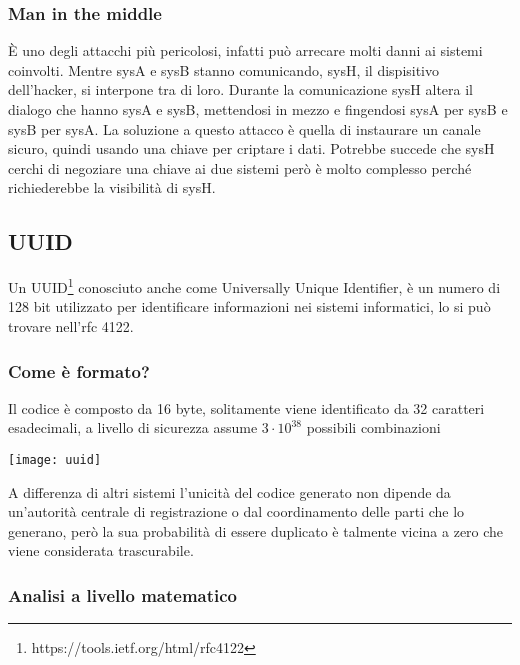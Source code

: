 \subsubsection{Man in the middle}
\hspace{\parindent}È uno degli attacchi più pericolosi, infatti può arrecare molti danni ai sistemi coinvolti. Mentre sysA e sysB stanno comunicando, sysH, il dispisitivo dell'hacker, si interpone tra di loro. Durante la comunicazione sysH altera il dialogo che hanno sysA e sysB, mettendosi in mezzo e fingendosi sysA per sysB e sysB per sysA. La soluzione a questo attacco è quella di instaurare un canale sicuro, quindi usando una chiave per criptare i dati. 
Potrebbe succede che sysH cerchi di negoziare una chiave ai due sistemi però è molto complesso perché richiederebbe la visibilità di sysH.

\subsection{UUID}
\hspace{\parindent}Un UUID\footnote{https://tools.ietf.org/html/rfc4122} conosciuto anche come Universally Unique Identifier, è un numero di 128 bit utilizzato per identificare informazioni nei sistemi informatici, lo si può trovare nell'rfc 4122.
\subsubsection{Come è formato?}
Il codice è composto da 16 byte, solitamente viene identificato da 32 caratteri esadecimali, a livello di sicurezza assume $ 3 \cdot 10^{38}$ possibili combinazioni
\begin{center}
\texttt{[image: uuid]}
\end{center}
A differenza di altri sistemi l'unicità del codice generato non dipende da un'autorità centrale di registrazione o dal coordinamento delle parti che lo generano, però la sua probabilità di essere duplicato è talmente vicina a zero che viene considerata trascurabile.

\subsubsection{Analisi a livello matematico}

